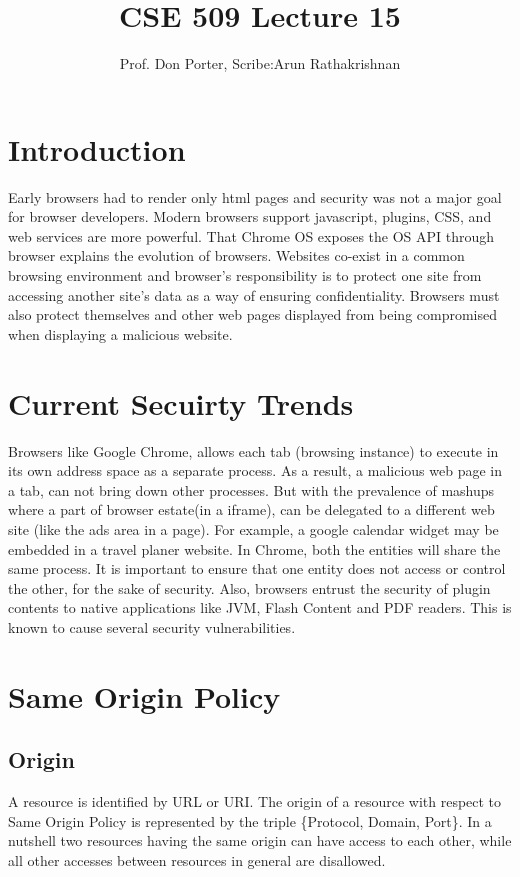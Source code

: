 \documentclass[11pt]{article} %
\title{CSE 509 Lecture 15}
\author{Prof. Don Porter, Scribe:Arun Rathakrishnan}
\begin{document}
\maketitle
\section {Introduction}
Early browsers had to render only html pages and security was not a major goal
for browser developers. Modern browsers support javascript, plugins, CSS,
and web services are more powerful. That Chrome OS exposes the OS API through browser
explains the evolution of browsers. Websites co-exist in a common browsing environment
and browser's responsibility is to protect one site from accessing another site's
data as a way of ensuring confidentiality. Browsers must also protect themselves
and other web pages displayed from being compromised when displaying a malicious
website.

\section {Current Secuirty Trends}
Browsers like Google Chrome, allows each tab (browsing instance) to execute in
its own address space as a separate process. As a result, a malicious web page
in a tab, can not bring down other processes. But with the prevalence of mashups
where a part of browser estate(in a iframe), can be delegated to a different
web site (like the ads area in a page). For example, a google calendar widget
may be embedded in a travel planer website. In Chrome, both the entities will
share the same process. It is important to ensure that one entity does not
access or control the other, for the sake of security.  Also, browsers entrust the security of plugin contents to native applications like JVM, Flash Content and PDF readers. This is known to cause several security vulnerabilities.
\section {Same Origin Policy}
\subsection {Origin}
A resource is identified by URL or URI. The origin of a resource with respect to
Same Origin Policy is represented by the triple \{Protocol, Domain, Port\}. In
a nutshell two resources having the same origin can have access to each other,
while all other accesses between resources in general are disallowed.
\end{document}
